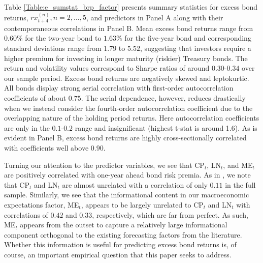 \documentclass[12pt,letterpaper,leqno,doublespacing]{article}
\begin{document}
Table \ref{Table:e_sumstat_brp_factor} presents summary statistics for excess bond returns, $rx_{t+4}^{\left(n\right)},n=2,\ldots,5$, and predictors in Panel A along with their contemporaneous correlations in Panel B. Mean excess bond returns range from $0.60\%$ for the two-year bond to $1.63\%$ for the five-year bond and corresponding standard deviations range from $1.79$ to $5.52$, suggesting that investors require a higher premium for investing in longer maturity (riskier) Treasury bonds. The return and volatility values correspond to Sharpe ratios of around $0.30$-$0.34$ over our sample period. Excess bond returns are negatively skewed and leptokurtic. All bonds display strong serial correlation with first-order autocorrelation coefficients of about $0.75$. The serial dependence, however, reduces drastically when we instead consider the fourth-order autocorrelation coefficient due to the overlapping nature of the holding period returns. Here autocorrelation coefficients are only in the $0.1$-$0.2$ range and insignificant (highest t-stat is around 1.6). As is evident in Panel B, excess bond returns are highly cross-sectionally correlated with coefficients well above $0.90$. 

Turning our attention to the predictor variables, we see that CP$_{t}$, LN$_{t}$, and ME$_{t}$ are positively correlated with one-year ahead bond risk premia. As in \cite{LudvigsonNg2009}, we note that CP$_{t}$ and LN$_{t}$ are almost unrelated with a correlation of only $0.11$ in the full sample. Similarly, we see that the informational content in our macroeconomic expectations factor, ME$_{t}$, appears to be largely unrelated to CP$_{t}$ and LN$_{t}$ with correlations of $0.42$ and $0.33$, respectively, which are far from perfect. As such, ME$_{t}$ appears from the outset to capture a relatively large informational component orthogonal to the existing forecasting factors from the literature. Whether this information is useful for predicting excess bond returns is, of course, an important empirical question that this paper seeks to address. 

\end{document}
